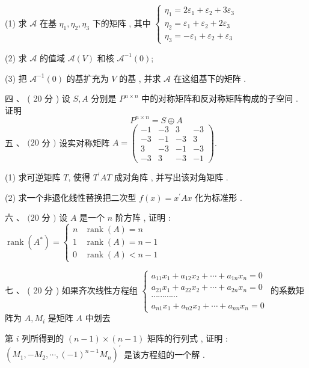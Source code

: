 \documentclass[10pt]{article}
\begin{document}
{(1)  求  $\mathscr{A}$  在基  $\eta_{1}, \eta_{2}, \eta_{3}$  下的矩阵 ,  其中  $\left\{\begin{array}{c}\eta_{1}=2 \varepsilon_{1}+\varepsilon_{2}+3 \varepsilon_{3} \\ \eta_{2}=\varepsilon_{1}+\varepsilon_{2}+2 \varepsilon_{3} \\ \eta_{3}=-\varepsilon_{1}+\varepsilon_{2}+\varepsilon_{3}\end{array}\right.$

(2)  求  $\mathscr{A}$  的值域  $\mathscr{A}(V)$  和核  $\mathscr{A}^{-1}(0)$;

(3)  把  $\mathscr{A}^{-1}(0)$  的基扩充为  $V$  的基 ,  并求  $\mathscr{A}$  在这组基下的矩阵 .

 四 、 ( 20  分 )  设  $S, A$  分别是  $P^{n \times n}$  中的对称矩阵和反对称矩阵构成的子空间 .  证明 
$$
P^{n \times n}=S \oplus A
$$
 五 、 $(20$  分  $)$  设实对称矩阵  $A=\left(\begin{array}{cccc}-1 & -3 & 3 & -3 \\ -3 & -1 & -3 & 3 \\ 3 & -3 & -1 & -3 \\ -3 & 3 & -3 & -1\end{array}\right)$.

(1)  求可逆矩阵  $T$,  使得  $T^{\prime} A T$  成对角阵 ,  并写出该对角矩阵 .

(2)  求一个非退化线性替换把二次型  $f(x)=x^{\prime} A x$  化为标准形 .

 六 、 $(20$  分  $)$  设  $A$  是一个  $n$  阶方阵 ,  证明 : $\operatorname{rank}\left(A^{*}\right)=\left\{\begin{array}{cc}n & \operatorname{rank}(A)=n \\ 1 & \operatorname{rank}(A)=n-1 \\ 0 & \operatorname{rank}(A)<n-1\end{array}\right.$

 七 、 ( 20  分 )  如果齐次线性方程组  $\left\{\begin{array}{c}a_{11} x_{1}+a_{12} x_{2}+\cdots+a_{1 n} x_{n}=0 \\ a_{21} x_{1}+a_{22} x_{2}+\cdots+a_{2 n} x_{n}=0 \\ \cdots \cdots \cdots \cdots \\ a_{n 1} x_{1}+a_{n 2} x_{2}+\cdots+a_{n n} x_{n}=0\end{array}\right.$  的系数矩阵为  $A, M_{i}$  是矩阵  $A$  中划去 

 第  $i$  列所得到的  $(n-1) \times(n-1)$  矩阵的行列式 ,  证明 : $\left(M_{1},-M_{2}, \cdots,(-1)^{n-1} M_{n}\right)^{\prime}$  是该方程组的一个解 .

}
\end{document}
